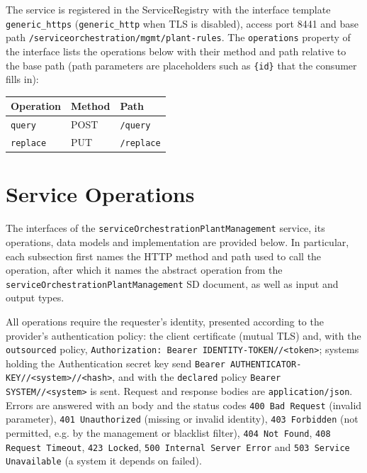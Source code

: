 \documentclass[a4paper]{arrowhead}
\newcommand{\mref}[2][]{{\textcolor{ArrowheadPurple}{\hyperref[sec:model:#2]{\ifstrempty{#1}{#2}{#1}}}}}
\begin{document}
The service is registered in the ServiceRegistry with the interface template \texttt{generic\_\allowbreak{}https} (\texttt{generic\_\allowbreak{}http} when TLS is disabled), access port 8441 and base path \texttt{/\allowbreak{}serviceorchestration/\allowbreak{}mgmt/\allowbreak{}plant-\allowbreak{}rules}. The \texttt{operations} property of the interface lists the operations below with their method and path relative to the base path (path parameters are placeholders such as \texttt{\{id\}} that the consumer fills in):

\noindent\begin{longtable}{| p{5.2cm} | p{1.6cm} | p{8.4cm} |} \hline
\rowcolor{gray!33} Operation & Method & Path \\ \hline \endhead
\texttt{query} & POST & \texttt{/\allowbreak{}query} \\ \hline
\texttt{replace} & PUT & \texttt{/\allowbreak{}replace} \\ \hline
\end{longtable}

\newpage

\section{Service Operations}
\label{sec:operations}

The interfaces of the \texttt{service\allowbreak{}Orchestration\allowbreak{}Plant\allowbreak{}Management} service, its operations, data models and implementation are provided below.
In particular, each subsection first names the HTTP method and path used to call the operation, after which it names the abstract operation from the \texttt{service\allowbreak{}Orchestration\allowbreak{}Plant\allowbreak{}Management} SD document, as well as input and output types.

All operations require the requester's identity, presented according to the provider's authentication policy: the client certificate (mutual TLS) and, with the \texttt{outsourced} policy, \texttt{Authorization: Bearer IDENTITY-TOKEN//<token>}; systems holding the Authentication secret key send \texttt{Bearer AUTHENTICATOR-KEY//<system>//<hash>}, and with the \texttt{declared} policy \texttt{Bearer SYSTEM//<system>} is sent. Request and response bodies are \texttt{application/json}.
Errors are answered with an \mref{ErrorMessage} body and the status codes \texttt{400 Bad Request} (invalid parameter), \texttt{401 Unauthorized} (missing or invalid identity), \texttt{403 Forbidden} (not permitted, e.g. by the management or blacklist filter), \texttt{404 Not Found}, \texttt{408 Request Timeout}, \texttt{423 Locked}, \texttt{500 Internal Server Error} and \texttt{503 Service Unavailable} (a system it depends on failed).
\end{document}

